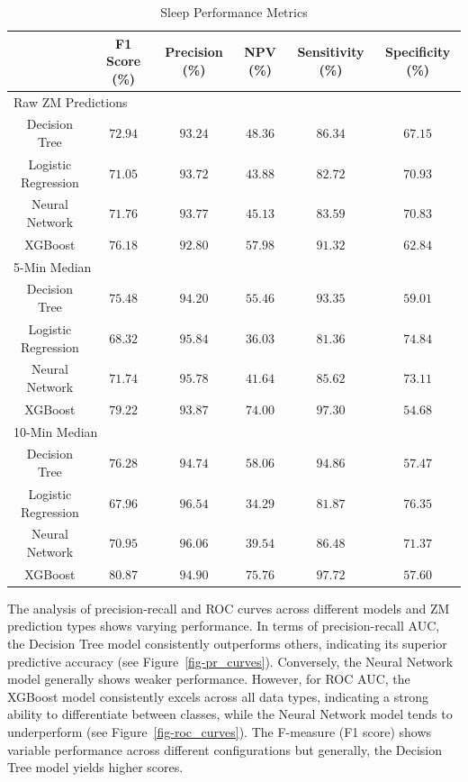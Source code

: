 \documentclass[
  super,
  preprint,
  3p]{elsarticle}
\begin{document}
\hypertarget{tbl-sleep_performance}{}
\begin{longtable}{cccccc}
\caption{\label{tbl-sleep_performance}Sleep Performance Metrics }\tabularnewline

\toprule
 & F1 Score (\%) & Precision (\%) & NPV (\%) & Sensitivity (\%) & Specificity (\%) \\ 
\midrule
\multicolumn{6}{l}{Raw ZM Predictions} \\ 
\midrule
Decision Tree & $72.94$ & $93.24$ & $48.36$ & $86.34$ & $67.15$ \\ 
Logistic Regression & $71.05$ & $93.72$ & $43.88$ & $82.72$ & $70.93$ \\ 
Neural Network & $71.76$ & $93.77$ & $45.13$ & $83.59$ & $70.83$ \\ 
XGBoost & $76.18$ & $92.80$ & $57.98$ & $91.32$ & $62.84$ \\ 
\midrule
\multicolumn{6}{l}{5-Min Median} \\ 
\midrule
Decision Tree & $75.48$ & $94.20$ & $55.46$ & $93.35$ & $59.01$ \\ 
Logistic Regression & $68.32$ & $95.84$ & $36.03$ & $81.36$ & $74.84$ \\ 
Neural Network & $71.74$ & $95.78$ & $41.64$ & $85.62$ & $73.11$ \\ 
XGBoost & $79.22$ & $93.87$ & $74.00$ & $97.30$ & $54.68$ \\ 
\midrule
\multicolumn{6}{l}{10-Min Median} \\ 
\midrule
Decision Tree & $76.28$ & $94.74$ & $58.06$ & $94.86$ & $57.47$ \\ 
Logistic Regression & $67.96$ & $96.54$ & $34.29$ & $81.87$ & $76.35$ \\ 
Neural Network & $70.95$ & $96.06$ & $39.54$ & $86.48$ & $71.37$ \\ 
XGBoost & $80.87$ & $94.90$ & $75.76$ & $97.72$ & $57.60$ \\ 
\bottomrule
\end{longtable}

The analysis of precision-recall and ROC curves across different models
and ZM prediction types shows varying performance. In terms of
precision-recall AUC, the Decision Tree model consistently outperforms
others, indicating its superior predictive accuracy (see
Figure~\ref{fig-pr_curves}). Conversely, the Neural Network model
generally shows weaker performance. However, for ROC AUC, the XGBoost
model consistently excels across all data types, indicating a strong
ability to differentiate between classes, while the Neural Network model
tends to underperform (see Figure~\ref{fig-roc_curves}). The F-measure
(F1 score) shows variable performance across different configurations
but generally, the Decision Tree model yields higher scores.
\end{document}
